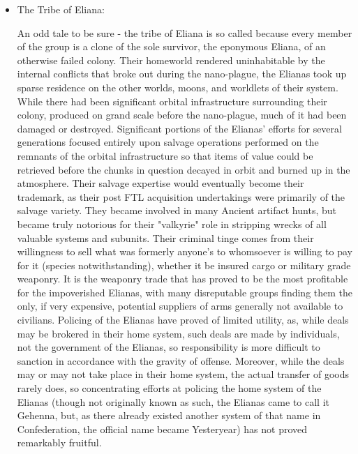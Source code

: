 \begin{itemize}
\item The Tribe of Eliana: 

An odd tale to be sure - the tribe of Eliana is so called because
every member of the group is a clone of the sole survivor, the
eponymous Eliana, of an otherwise failed colony. Their homeworld
rendered uninhabitable by the internal conflicts that broke out during
the nano-plague, the Elianas took up sparse residence on the other
worlds, moons, and worldlets of their system. While there had been
significant orbital infrastructure surrounding their colony, produced
on grand scale before the nano-plague, much of it had been damaged or
destroyed. Significant portions of the Elianas' efforts for several
generations focused entirely upon salvage operations performed on the
remnants of the orbital infrastructure so that items of value could be
retrieved before the chunks in question decayed in orbit and burned up
in the atmosphere. Their salvage expertise would eventually become
their trademark, as their post FTL acquisition undertakings were
primarily of the salvage variety. They became involved in many Ancient
artifact hunts, but became truly notorious for their "valkyrie" role
in stripping wrecks of all valuable systems and subunits. Their
criminal tinge comes from their willingness to sell what was formerly
anyone's to whomsoever is willing to pay for it (species
notwithstanding), whether it be insured cargo or military grade
weaponry. It is the weaponry trade that has proved to be the most
profitable for the impoverished Elianas, with many disreputable groups
finding them the only, if very expensive, potential suppliers of arms
generally not available to civilians. Policing of the Elianas have
proved of limited utility, as, while deals may be brokered in their
home system, such deals are made by individuals, not the government of
the Elianas, so responsibility is more difficult to sanction in
accordance with the gravity of offense. Moreover, while the deals may
or may not take place in their home system, the actual transfer of
goods rarely does, so concentrating efforts at policing the home
system of the Elianas (though not originally known as such, the
Elianas came to call it Gehenna, but, as there already existed another
system of that name in Confederation, the official name became
Yesteryear) has not proved remarkably fruitful.


\end{itemize}
